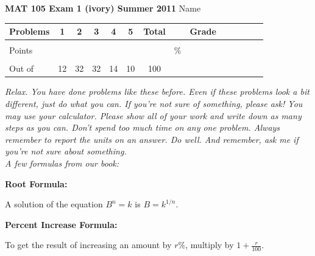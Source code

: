 \documentclass[12pt]{article}
\begin{document}
\textbf{MAT 105 Exam 1 (ivory) Summer 2011} \hspace{.4in} {\large Name} \hrulefill

\begin{center}

\begin{tabular}
{|l|c|c|c|c|c|c|c|c|c|c|c|c|c|} \hline

 Problems & \hspace{5 pt} 1 \hspace{5 pt}  & \hspace{5 pt} 2 \hspace{5 pt} & \hspace{5 pt} 3 \hspace{5 pt} & \hspace{5 pt} 4 \hspace{5 pt} & \hspace{5 pt} 5 \hspace{5 pt} & \hspace{5 pt} Total  \hspace{5 pt} & &  \hspace{5 pt} Grade \hspace{5 pt}  \\ \hline
&&&&&&&&\\  
Points &&&&&&&    \hspace{.8in}\% &  \\ 
&&&&&&&& \\  \hline
Out of & 12 & 32 & 32 & 14 & 10 &100 & & \\ \hline

\end {tabular}

\end{center}

\vspace{.2in}

 \emph{Relax.  You have done problems like these before.  Even if these problems look a bit different, just do what you can.  If you're not sure of something, please ask! You may use your calculator.  Please show all of your work and write down as many steps as you can.  Don't spend too much time on any one problem.  Always remember to report the units on an answer. Do well.  And remember, ask me if you're not sure about something.} \\

\vspace{.5in} 
\noindent \emph{A few formulas from our book:}
\begin{center}

\textbf{Root Formula:} 

A solution of the equation $B^n=k$ is $B=k^{1/n}$.

\vspace{.2in} 

\textbf{Percent Increase Formula:} 

To get the result of increasing an amount by $r$\%, multiply by $1 + \frac{r}{100}$.

\end{center}
\end{document}
